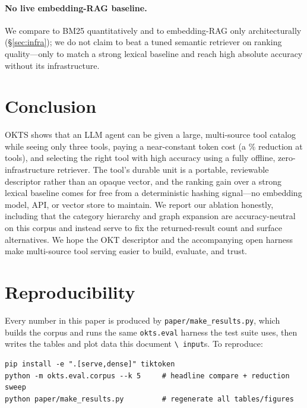 \documentclass[11pt]{article}
\begin{document}
\paragraph{No live embedding-RAG baseline.} We compare to BM25 quantitatively and
to embedding-RAG only architecturally (\S\ref{sec:infra}); we do not claim to beat
a tuned semantic retriever on ranking quality---only to match a strong lexical
baseline and reach high absolute accuracy without its infrastructure.

\section{Conclusion}

OKTS shows that an LLM agent can be given a large, multi-source tool catalog while
seeing only three tools, paying a near-constant token cost (a \reductionFull\%
reduction at \numTools{} tools), and selecting the right tool with high accuracy
using a fully offline, zero-infrastructure retriever. The tool's durable unit is a
portable, reviewable descriptor rather than an opaque vector, and the ranking
gain over a strong lexical baseline comes for free from a deterministic hashing
signal---no embedding model, API, or vector store to maintain. We report our
ablation honestly, including that the category hierarchy and graph expansion are
accuracy-neutral on this corpus and instead serve to fix the returned-result count
and surface alternatives. We hope the OKT descriptor and the accompanying open
harness make multi-source tool serving easier to build, evaluate, and trust.

\appendix
\section{Reproducibility}
\label{sec:repro}

Every number in this paper is produced by \texttt{paper/make\_results.py}, which
builds the corpus and runs the same \texttt{okts.eval} harness the test suite
uses, then writes the tables and plot data this document \texttt{\textbackslash
input}s. To reproduce:

\begin{lstlisting}[style=okt]
pip install -e ".[serve,dense]" tiktoken
python -m okts.eval.corpus --k 5     # headline compare + reduction sweep
python paper/make_results.py         # regenerate all tables/figures
\end{lstlisting}
\end{document}
